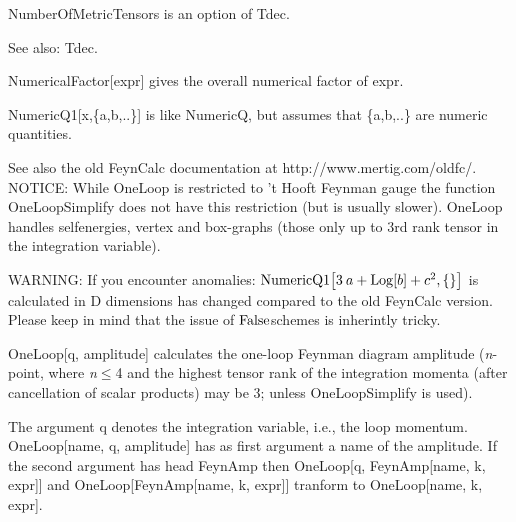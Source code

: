 
NumberOfMetricTensors is an option of Tdec.

See also:  Tdec.



NumericalFactor[expr] gives the overall numerical factor of expr.



NumericQ1[x,\{a,b,..\}] is like NumericQ, but assumes that \{a,b,..\} are numeric quantities.









See also the old FeynCalc documentation at http://www.mertig.com/oldfc/. NOTICE: While OneLoop is restricted to 't Hooft Feynman gauge the function
OneLoopSimplify does not have this restriction (but is usually slower). OneLoop handles selfenergies, vertex and box-graphs (those only up to 3rd
rank
  tensor in the integration variable).

WARNING: If you encounter anomalies: \(\Muserfunction{NumericQ1}\big[3\multsp a+\log [b]+{c^2},\{\}\big]\) is calculated in D dimensions has changed
compared to the old FeynCalc version. Please keep in mind that the issue of \(\mathrm{False}\)schemes is inherintly tricky.


OneLoop[q, amplitude] calculates the one-loop Feynman diagram amplitude ({\itshape n}-point, where {\itshape n}\(\leq \)4 and the highest tensor
rank of the integration momenta (after cancellation of scalar products) may be 3; unless
  OneLoopSimplify is used).

The argument q denotes the integration variable, i.e., the loop momentum. OneLoop[name, q, amplitude] has as first argument a name of the
  amplitude. If the second argument has head FeynAmp then OneLoop[q, FeynAmp[name, k, expr]] and OneLoop[FeynAmp[name, k, expr]] tranform
  to OneLoop[name, k, expr].

